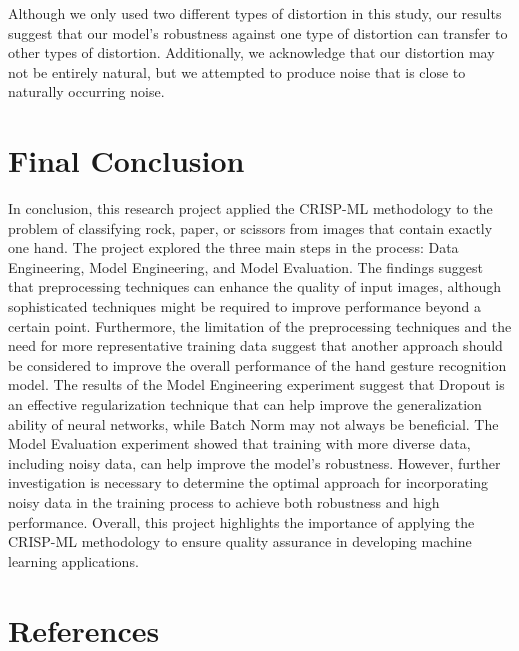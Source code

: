 \documentclass[a4paper]{article}
\begin{document}
Although we only used two different types of distortion in this study, our results suggest that our model's robustness against one type of distortion can transfer to other types of distortion. Additionally, we acknowledge that our distortion may not be entirely natural, but we attempted to produce noise that is close to naturally occurring noise.


\section{Final Conclusion}

In conclusion, this research project applied the CRISP-ML methodology to the problem of classifying rock, paper, or scissors from images that contain exactly one hand. The project explored the three main steps in the process: Data Engineering, Model Engineering, and Model Evaluation. 
The findings suggest that preprocessing techniques can enhance the quality of input images, although sophisticated techniques might be required to improve performance beyond a certain point. Furthermore, the limitation of the preprocessing techniques and the need for more representative training data suggest that another approach should be considered to improve the overall performance of the hand gesture recognition model. 
The results of the Model Engineering experiment suggest that Dropout is an effective regularization technique that can help improve the generalization ability of neural networks, while Batch Norm may not always be beneficial. 
The Model Evaluation experiment showed that training with more diverse data, including noisy data, can help improve the model's robustness. However, further investigation is necessary to determine the optimal approach for incorporating noisy data in the training process to achieve both robustness and high performance. Overall, this project highlights the importance of applying the CRISP-ML methodology to ensure quality assurance in developing machine learning applications.

\newpage
\section*{References}






\end{document}
